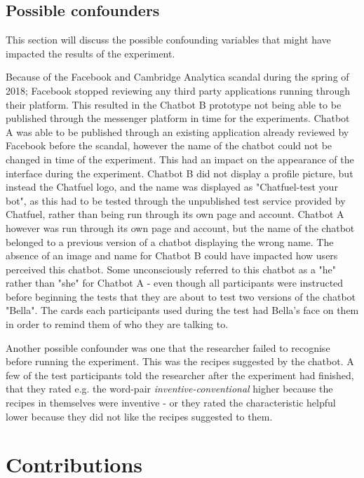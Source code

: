 \subsection{Possible confounders}
This section will discuss the possible confounding variables that might have impacted the results of the experiment.

Because of the Facebook and Cambridge Analytica scandal during the spring of 2018; Facebook stopped reviewing any third party applications running through their platform. This resulted in the Chatbot B prototype not being able to be published through the messenger platform in time for the experiments. Chatbot A was able to be published through an existing application already reviewed by Facebook before the scandal, however the name of the chatbot could not be changed in time of the experiment. This had an impact on the appearance of the interface during the experiment. Chatbot B did not display a profile picture, but instead the Chatfuel logo, and the name was displayed as "Chatfuel-test your bot", as this had to be tested through the unpublished test service provided by Chatfuel, rather than being run through its own page and account. Chatbot A however was run through its own page and account, but the name of the chatbot belonged to a previous version of a chatbot displaying the wrong name. The absence of an image and name for Chatbot B could have impacted how users perceived this chatbot. Some unconsciously referred to this chatbot as a "he" rather than "she" for Chatbot A - even though all participants were instructed before beginning the tests that they are about to test two versions of the chatbot "Bella". The cards each participants used during the test had Bella's face on them in order to remind them of who they are talking to. 

Another possible confounder was one that the researcher failed to recognise before running the experiment. This was the recipes suggested by the chatbot. A few of the test participants told the researcher after the experiment had finished, that they rated e.g. the word-pair \textit{inventive-conventional} higher because the recipes in themselves were inventive - or they rated the characteristic helpful lower because they did not like the recipes suggested to them. 

\section{Contributions}

